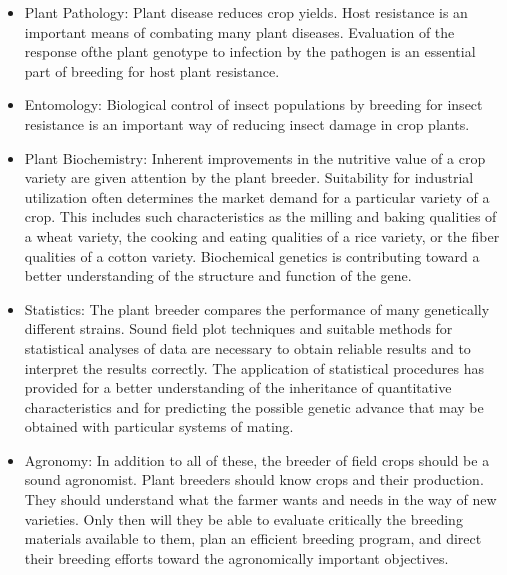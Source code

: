 \documentclass[11pt,ignorenonframetext,aspectratio=169]{beamer}
\begin{document}
\begin{frame}{}
\protect\hypertarget{section-17}{}
\begin{itemize}
\item
  Plant Pathology: Plant disease reduces crop yields. Host resistance is
  an important means of combating many plant diseases. Evaluation of the
  response ofthe plant genotype to infection by the pathogen is an
  essential part of breeding for host plant resistance.
\item
  Entomology: Biological control of insect populations by breeding for
  insect resistance is an important way of reducing insect damage in
  crop plants.
\item
  Plant Biochemistry: Inherent improvements in the nutritive value of a
  crop variety are given attention by the plant breeder. Suitability for
  industrial utilization often determines the market demand for a
  particular variety of a crop. This includes such characteristics as
  the milling and baking qualities of a wheat variety, the cooking and
  eating qualities of a rice variety, or the fiber qualities of a cotton
  variety. Biochemical genetics is contributing toward a better
  understanding of the structure and function of the gene.
\end{itemize}
\end{frame}

\begin{frame}{}
\protect\hypertarget{section-18}{}
\begin{itemize}
\item
  Statistics: The plant breeder compares the performance of many
  genetically different strains. Sound field plot techniques and
  suitable methods for statistical analyses of data are necessary to
  obtain reliable results and to interpret the results correctly. The
  application of statistical procedures has provided for a better
  understanding of the inheritance of quantitative characteristics and
  for predicting the possible genetic advance that may be obtained with
  particular systems of mating.
\item
  Agronomy: In addition to all of these, the breeder of field crops
  should be a sound agronomist. Plant breeders should know crops and
  their production. They should understand what the farmer wants and
  needs in the way of new varieties. Only then will they be able to
  evaluate critically the breeding materials available to them, plan an
  efficient breeding program, and direct their breeding efforts toward
  the agronomically important objectives.
\end{itemize}
\end{frame}
\end{document}
